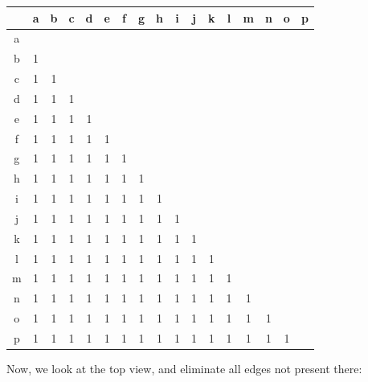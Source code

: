 \documentclass[
11pt, %
english, %
singlespacing, %
headsepline, %
]{MastersDoctoralThesis} %
\begin{document}
\begin{center}
\begin{tabular}[width = \textwidth]{ |c|c|c|c|c|c|c|c|c|c|c|c|c|c|c|c|c| } 
\hline
  & a & b & c & d & e & f & g & h & i & j & k & l & m & n & o & p \\ \hline \hline
a &   &   &   &   &   &   &   &   &   &   &   &   &   &   &   &   \\ \hline
b & 1 &   &   &   &   &   &   &   &   &   &   &   &   &   &   &   \\ \hline
c & 1 & 1 &   &   &   &   &   &   &   &   &   &   &   &   &   &   \\ \hline
d & 1 & 1 & 1 &   &   &   &   &   &   &   &   &   &   &   &   &   \\ \hline
e & 1 & 1 & 1 & 1 &   &   &   &   &   &   &   &   &   &   &   &   \\ \hline
f & 1 & 1 & 1 & 1 & 1 &   &   &   &   &   &   &   &   &   &   &   \\ \hline
g & 1 & 1 & 1 & 1 & 1 & 1 &   &   &   &   &   &   &   &   &   &   \\ \hline
h & 1 & 1 & 1 & 1 & 1 & 1 & 1 &   &   &   &   &   &   &   &   &   \\ \hline 
i & 1 & 1 & 1 & 1 & 1 & 1 & 1 & 1 &   &   &   &   &   &   &   &   \\ \hline
j & 1 & 1 & 1 & 1 & 1 & 1 & 1 & 1 & 1 &   &   &   &   &   &   &   \\ \hline
k & 1 & 1 & 1 & 1 & 1 & 1 & 1 & 1 & 1 & 1 &   &   &   &   &   &   \\ \hline
l & 1 & 1 & 1 & 1 & 1 & 1 & 1 & 1 & 1 & 1 & 1 &   &   &   &   &   \\ \hline
m & 1 & 1 & 1 & 1 & 1 & 1 & 1 & 1 & 1 & 1 & 1 & 1 &   &   &   &   \\ \hline
n & 1 & 1 & 1 & 1 & 1 & 1 & 1 & 1 & 1 & 1 & 1 & 1 & 1 &   &   &   \\ \hline
o & 1 & 1 & 1 & 1 & 1 & 1 & 1 & 1 & 1 & 1 & 1 & 1 & 1 & 1 &   &   \\ \hline
p & 1 & 1 & 1 & 1 & 1 & 1 & 1 & 1 & 1 & 1 & 1 & 1 & 1 & 1 & 1 &   \\ \hline
\hline
\end{tabular}
\end{center}
\vfill
Now, we look at the top view, and eliminate all edges not present there: \\ \\
\end{document}
